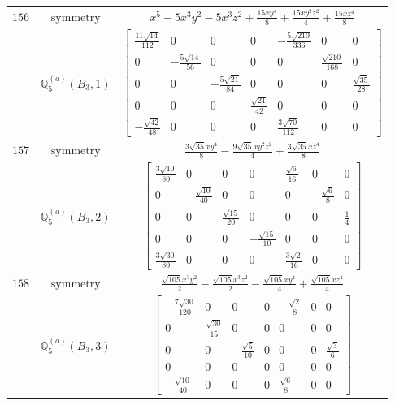 \documentclass[fleqn,8pt,landscape]{jsarticle}
\begin{document}
\begin{longtable}{ccc}
$ 156 $ & $ \text{symmetry} $ & $ x^{5} - 5 x^{3} y^{2} - 5 x^{3} z^{2} + \frac{15 x y^{4}}{8} + \frac{15 x y^{2} z^{2}}{4} + \frac{15 x z^{4}}{8} $ \\
$  $ & $ \mathbb{Q}_{5}^{(a)}(B_{3},1) $ & $ \begin{bmatrix} \frac{11 \sqrt{14}}{112} & 0 & 0 & 0 & - \frac{5 \sqrt{210}}{336} & 0 & 0 \\ 0 & - \frac{5 \sqrt{14}}{56} & 0 & 0 & 0 & \frac{\sqrt{210}}{168} & 0 \\ 0 & 0 & - \frac{5 \sqrt{21}}{84} & 0 & 0 & 0 & \frac{\sqrt{35}}{28} \\ 0 & 0 & 0 & \frac{\sqrt{21}}{42} & 0 & 0 & 0 \\ - \frac{\sqrt{42}}{48} & 0 & 0 & 0 & \frac{3 \sqrt{70}}{112} & 0 & 0 \end{bmatrix} $ \\ \hline
$ 157 $ & $ \text{symmetry} $ & $ \frac{3 \sqrt{35} x y^{4}}{8} - \frac{9 \sqrt{35} x y^{2} z^{2}}{4} + \frac{3 \sqrt{35} x z^{4}}{8} $ \\
$  $ & $ \mathbb{Q}_{5}^{(a)}(B_{3},2) $ & $ \begin{bmatrix} \frac{3 \sqrt{10}}{80} & 0 & 0 & 0 & \frac{\sqrt{6}}{16} & 0 & 0 \\ 0 & - \frac{\sqrt{10}}{40} & 0 & 0 & 0 & - \frac{\sqrt{6}}{8} & 0 \\ 0 & 0 & \frac{\sqrt{15}}{20} & 0 & 0 & 0 & \frac{1}{4} \\ 0 & 0 & 0 & - \frac{\sqrt{15}}{10} & 0 & 0 & 0 \\ \frac{3 \sqrt{30}}{80} & 0 & 0 & 0 & \frac{3 \sqrt{2}}{16} & 0 & 0 \end{bmatrix} $ \\ \hline
$ 158 $ & $ \text{symmetry} $ & $ \frac{\sqrt{105} x^{3} y^{2}}{2} - \frac{\sqrt{105} x^{3} z^{2}}{2} - \frac{\sqrt{105} x y^{4}}{4} + \frac{\sqrt{105} x z^{4}}{4} $ \\
$  $ & $ \mathbb{Q}_{5}^{(a)}(B_{3},3) $ & $ \begin{bmatrix} - \frac{7 \sqrt{30}}{120} & 0 & 0 & 0 & - \frac{\sqrt{2}}{8} & 0 & 0 \\ 0 & \frac{\sqrt{30}}{15} & 0 & 0 & 0 & 0 & 0 \\ 0 & 0 & - \frac{\sqrt{5}}{10} & 0 & 0 & 0 & \frac{\sqrt{3}}{6} \\ 0 & 0 & 0 & 0 & 0 & 0 & 0 \\ - \frac{\sqrt{10}}{40} & 0 & 0 & 0 & \frac{\sqrt{6}}{8} & 0 & 0 \end{bmatrix} $ \\ \hline

\end{longtable}
\end{document}
